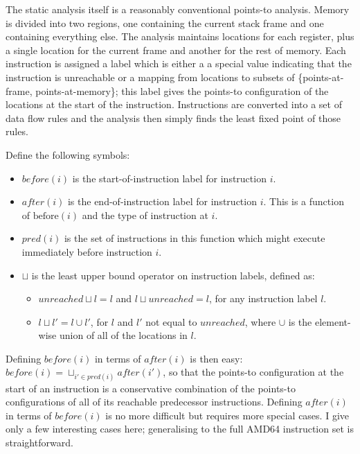 The static analysis itself is a reasonably conventional points-to
analysis.  Memory is divided into two regions, one containing the
current stack frame and one containing everything else.  The analysis
maintains locations for each register, plus a single location for the
current frame and another for the rest of memory.  Each instruction is
assigned a label which is either a a special value indicating that the
instruction is unreachable or a mapping from locations to subsets of
\{points-at-frame, points-at-memory\}; this label gives the points-to
configuration of the locations at the start of the instruction.
Instructions are converted into a set of data flow rules and the
analysis then simply finds the least fixed point of those
rules.

Define the following symbols:

\begin{itemize}
\item $\mathit{before}(i)$ is the start-of-instruction label for instruction
  $i$.
\item $\mathit{after}(i)$ is the end-of-instruction label for
  instruction $i$.  This is a function of $\mathrm{before}(i)$ and the
  type of instruction at $i$.
\item $\mathit{pred}(i)$ is the set of instructions in this function
  which might execute immediately before instruction $i$.
\item $\sqcup$ is the least upper bound operator on instruction
  labels, defined as:

  \begin{itemize}
  \item $\mathit{unreached} {\sqcup} l = l$ and $l {\sqcup}
    \mathit{unreached} = l$, for any instruction label $l$.
  \item $l {\sqcup} l' = l \cup l'$, for $l$ and $l'$ not equal to
    $\mathit{unreached}$, where $\cup$ is the element-wise union of
    all of the locations in $l$.
  \end{itemize}
\end{itemize}

Defining $\mathit{before}(i)$ in terms of $\mathit{after}(i)$ is then
easy: $\mathit{before}(i) = \sqcup_{i' \in
  \mathit{pred}(i)}\mathit{after}(i')$, so that the points-to
configuration at the start of an instruction is a conservative
combination of the points-to configurations of all of its reachable
predecessor instructions.  Defining $\mathit{after}(i)$ in terms of
$\mathit{before}(i)$ is no more difficult but requires more special
cases.  I give only a few interesting cases here; generalising to the
full AMD64 instruction set is straightforward.

